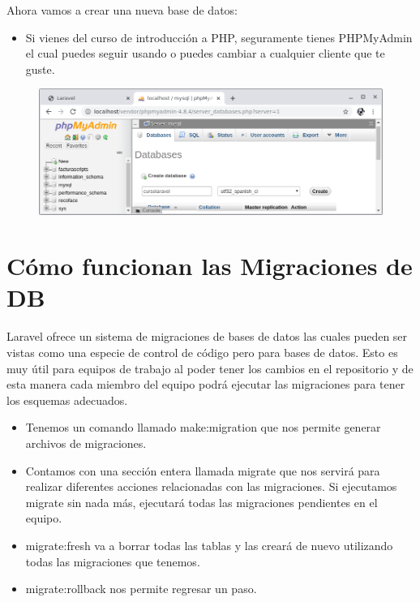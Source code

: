 \documentclass{article}
\begin{document}
Ahora vamos a crear una nueva base de datos:

\begin{itemize}
  \item Si vienes del curso de introducción a PHP, seguramente tienes
    PHPMyAdmin el cual puedes seguir usando o puedes cambiar a cualquier
    cliente que te guste.
\end{itemize}

\begin{figure}[h!]
  \centering
  \includegraphics[scale=0.5]{./Pictures/022_bd.png}
\end{figure}


\section{Cómo funcionan las Migraciones de DB}%
Laravel ofrece un sistema de migraciones de bases de datos las cuales pueden
ser vistas como una especie de control de código pero para bases de datos. Esto
es muy útil para equipos de trabajo al poder tener los cambios en el
repositorio y de esta manera cada miembro del equipo podrá ejecutar las
migraciones para tener los esquemas adecuados.\\

\begin{itemize}
  \item Tenemos un comando llamado make:migration que nos permite generar
    archivos de migraciones.
  \item Contamos con una sección entera llamada migrate que nos servirá para
    realizar diferentes acciones relacionadas con las migraciones. Si
    ejecutamos migrate sin nada más, ejecutará todas las migraciones pendientes
    en el equipo.
  \item migrate:fresh va a borrar todas las tablas y las creará de nuevo
    utilizando todas las migraciones que tenemos.
  \item migrate:rollback nos permite regresar un paso.
\end{itemize}
\end{document}
